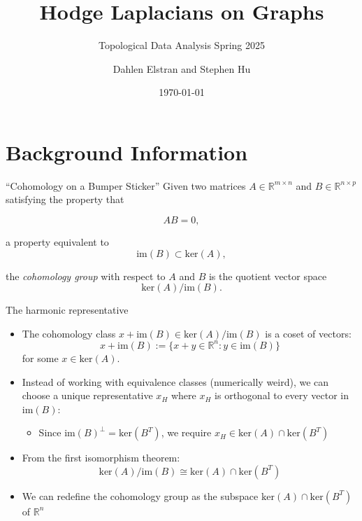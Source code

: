 \documentclass[aspectratio=169,xcolor=dvipsnames]{beamer}
\title{Hodge Laplacians on Graphs}
\subtitle{Topological Data Analysis Spring 2025}
\author{Dahlen Elstran and Stephen Hu}
\date{\today} %
\begin{document}
\begin{frame}
    \titlepage
\end{frame}

\section{Background Information}

\begin{frame}{``Cohomology on a Bumper Sticker''}
    Given two matrices $A \in \mathbb{R}^{m \times n}$ and 
    $B \in \mathbb{R}^{n \times p}$ satisfying the property that
    
    \begin{equation*}
    AB = 0,
    \end{equation*}
    
    a property equivalent to
    \begin{equation*}
    \text{im}(B) \subset \text{ker}(A),
    \end{equation*}
    
    the \emph{cohomology group} with respect to $A$ and $B$ is the quotient vector space
    \begin{equation*}
    \text{ker}(A)/\text{im}(B).
    \end{equation*}
\end{frame}

\begin{frame}{The harmonic representative}
    \begin{itemize}
        \item The cohomology class $x + \text{im}(B) \in \text{ker}(A)/\text{im}(B)$ is a coset of vectors:
        \begin{equation*}
            x + \text{im}(B) := \{x + y \in \mathbb{R}^n : y \in \text{im}(B)\}
        \end{equation*}
        for some $x \in \text{ker}(A)$. 
        
        \item Instead of working with equivalence classes (numerically weird), we can choose a unique representative $x_H$ where $x_H$ is orthogonal to every vector in $\text{im}(B)$:
        \begin{itemize}
            \item Since $\text{im}(B)^{\perp} = \text{ker}(B^T)$, we require $x_H \in \text{ker}(A) \cap \text{ker}(B^T)$
        \end{itemize}
        
        \item From the first isomorphism theorem:
        \begin{equation*}
            \text{ker}(A)/\text{im}(B) \cong \text{ker}(A) \cap \text{ker}(B^T)
        \end{equation*}
        
        \item We can redefine the cohomology group as the subspace $\text{ker}(A) \cap \text{ker}(B^T)$ of $\mathbb{R}^n$
    \end{itemize}
\end{frame}
\end{document}
